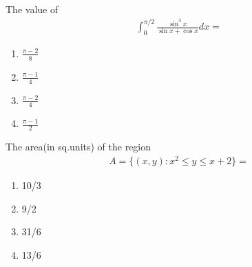 \item The value of
\begin{align*}
\int_{0}^{\pi/2}\frac{\sin^{3}x}{\sin x + \cos x}dx = 
\end{align*}
\begin{enumerate}
\item $\frac{\pi - 2}{8}$
\item $\frac{\pi - 1}{4}$
\item $\frac{\pi - 2}{4}$
\item $\frac{\pi - 1}{2}$
\end{enumerate}

\item The area(in sq.units) of the region
\begin{align*}
A = \{(x, y): x^2 \leq y \leq x + 2\} = 
\end{align*}
\begin{enumerate}
\item 10/3
\item 9/2
\item 31/6
\item 13/6
\end{enumerate}









